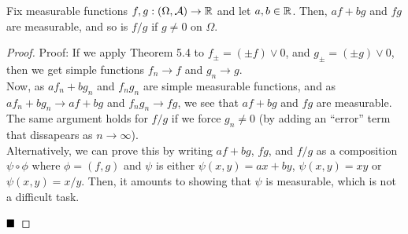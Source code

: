 
\begin{lemma}
    Fix measurable functions $f, g : (\Omega, \mathcal{A}) \to \mathbb{R}$ and let $a, b \in \mathbb{R}$. Then, $af + bg$ and $fg$ are measurable, and so is $f/g$ if $g \ne 0$ on $\Omega$. 
\end{lemma}
\begin{proof}{Proof:}
    If we apply Theorem 5.4 to $f_{\pm} = (\pm f) \vee 0$, and $g_{\pm} = (\pm g) \vee 0$, then we get simple functions $f_n \to f$ and $g_n \to g$.\\

    Now, as $af_n + bg_n$ and $f_ng_n$ are simple measurable functions, and as $af_n + bg_n \to af + bg$ and $f_ng_n \to fg$, we see that $af + bg$ and $fg$ are measurable. The same argument holds for $f/g$ if we force $g_n \ne 0$ (by adding an ``error'' term that dissapears as $n \to \infty$).\\

    Alternatively, we can prove this by writing $af + bg$, $fg$, and $f/g$ as a composition $\psi \circ \phi$ where $\phi = (f, g)$ and $\psi$ is either $\psi(x, y) = ax + by$, $\psi(x, y) = xy$ or $\psi(x, y) = x/y$. Then, it amounts to showing that $\psi$ is measurable, which is not a difficult task.

    $\qed$
\end{proof}